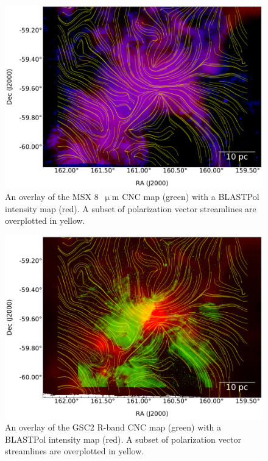 \begin{figure}[!htbp]
\centering
\includegraphics[width=\textwidth]{figures/carina/msx2_sl}
\caption[~An overlay of the MSX  CNC map (green) with a BLASTPol intensity map (red).]{An overlay of the MSX 8~$\upmu$m CNC map (green) \citep{smith2000large} with a BLASTPol intensity map (red). A subset of polarization vector streamlines are overplotted in yellow.}
\label{fig:msx_overplot}
\end{figure}

\begin{figure}[!htbp]
\centering
\includegraphics[width=\textwidth]{figures/carina/hstgsc2_250_sl}
\caption[~An overlay of the GSC2 R-band CNC map (green) with a BLASTPol intensity map (red).]{An overlay of the GSC2 R-band CNC map (green) \citep{lasker2008second} with a BLASTPol intensity map (red). A subset of polarization vector streamlines are overplotted in yellow.}
\label{fig:hst_overplot}
\end{figure}


